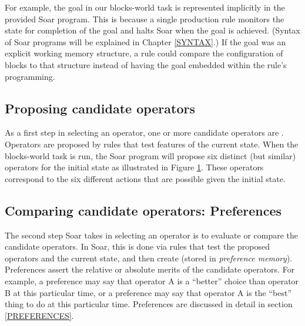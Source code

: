 For example, the goal in our blocks-world task is represented implicitly in the provided Soar program. This is because a single production rule monitors the state for completion of the goal and halts Soar when the goal is achieved. (Syntax of Soar programs will be explained in Chapter \ref{SYNTAX}.) If the goal was an explicit working memory structure, a rule could compare the configuration of blocks to that structure instead of having the goal embedded within the rule's programming.

\subsection{Proposing candidate operators}

As a first step in selecting an operator, one or more candidate operators are .  Operators are proposed by rules that test features of the current state.  When the blocks-world task is run, the Soar program will propose six distinct (but similar) operators for the initial state as illustrated in Figure \ref{fig:proposal}. These operators correspond to the six different actions that are possible given the initial state.

\begin{figure}
	\label{fig:proposal}
\end{figure}


\subsection{Comparing candidate operators: Preferences}

The second step Soar takes in selecting an operator is to evaluate or compare the candidate operators. In Soar, this is done via rules that test the proposed operators and the current state, and then create  (stored in \emph{preference memory}).  Preferences assert the relative or absolute merits of the candidate operators. For example, a preference may say that operator A is a ``better'' choice than operator B at this particular time, or a preference may say that operator A is the ``best'' thing to do at this particular time. Preferences are discussed in detail in section \ref{PREFERENCES}. 

